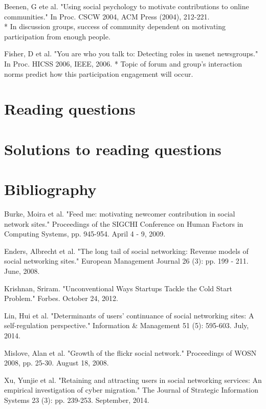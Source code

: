 \documentclass[class=book, crop=false]{standalone}
\begin{document}
Beenen, G ete al. "Using social psychology to motivate contributions to online communities." In Proc. CSCW 2004, ACM Press (2004), 212-221.\\
 * In discussion groups, success of community dependent on motivating participation from enough people.

Fisher, D et al. "You are who you talk to: Detecting roles in usenet newsgroups." In Proc. HICSS 2006, IEEE, 2006.
 * Topic of forum and group's interaction norms predict how this participation engagement will occur.

\section{Reading questions}

\section{Solutions to reading questions}

\section{Bibliography}

Burke, Moira et al. "Feed me: motivating newcomer contribution in social network sites." Proceedings of the SIGCHI Conference on Human Factors in Computing Systems, pp. 945-954. April 4 - 9, 2009.

Enders, Albrecht et al. "The long tail of social networking: Revenue models of social networking sites." European Management Journal 26 (3): pp. 199 - 211. June, 2008.

Krishnan, Sriram. "Unconventional Ways Startups Tackle the Cold Start Problem." Forbes. October 24, 2012.

Lin, Hui et al. "Determinants of users' continuance of social networking sites: A self-regulation perspective." Information \& Management 51 (5): 595-603. July, 2014.

Mislove, Alan et al. "Growth of the flickr social network." Proceedings of WOSN 2008, pp. 25-30. August 18, 2008.

Xu, Yunjie et al. "Retaining and attracting users in social networking services: An empirical investigation of cyber migration." The Journal of Strategic Information Systems 23 (3): pp. 239-253. September, 2014.
\end{document}
